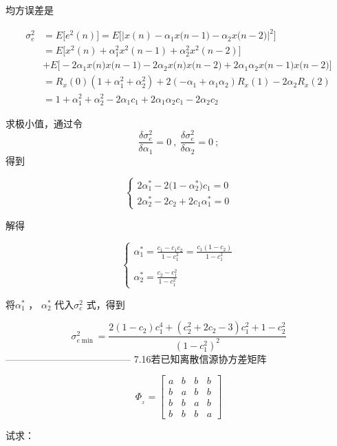 \documentclass[utf8]{article}
\begin{document}
均方误差是



$$\begin{aligned}
\sigma_{e}^{2}& =E\bigg[e^{2}\left(n\right)\bigg]=E\bigg[\bigg|x(n)-\alpha_{1}x\big(n-1\big)-\alpha_{2}x\big(n-2\big)\bigg|^{2}\bigg] \\
&=E\bigg[x^{2}\left(n\right)+\alpha_{1}^{2}x^{2}\left(n-1\right)+\alpha_{2}^{2}x^{2}\left(n-2\right)\bigg] \\
&+E\Big[-2\alpha_{1}x\big(n\big)x\big(n-1\big)-2\alpha_{2}x\big(n\big)x\big(n-2\big)+2\alpha_{1}\alpha_{2}x\big(n-1\big)x\big(n-2\big)\Big] \\
&=R_{x}\left(0\right)\left(1+\alpha_{1}^{2}+\alpha_{2}^{2}\right)+2\left(-\alpha_{1}+\alpha_{1}\alpha_{2}\right)R_{x}\left(1\right)-2\alpha_{2}R_{x}\left(2\right) \\
&=1+\alpha_{1}^{2}+\alpha_{2}^{2}-2\alpha_{1}c_{1}+2\alpha_{1}\alpha_{2}c_{1}-2\alpha_{2}c_{2}
\end{aligned}$$

求极小值，通过令$$\frac{\delta\sigma_{e}^{2}}{\delta\alpha_{1}}=0\:,\:\frac{\delta\sigma_{e}^{2}}{\delta\alpha_{2}}=0\:;$$
得到

$$\begin{cases}2\alpha_1^*-2\Big(1-\alpha_2^*\Big)c_1=0\\2\alpha_2^*-2c_2+2c_1\alpha_1^*=0\end{cases}$$

解得

$$\begin{cases}\alpha_1^*=\frac{c_1-c_1c_2}{1-c_1^2}=\frac{c_1\left(1-c_2\right)}{1-c_1^2}\\\\\alpha_2^*=\frac{c_2-c_1^2}{1-c_1^2}\end{cases}$$

将$\alpha_{1}^{*}$ ， $\alpha_{2}^*$ 代入$\sigma_{c}^{2}$ 式，得到

$$\sigma_{e\min}^{2}=\frac{2\left(1-c_{2}\right)c_{1}^{4}+\left(c_{2}^{2}+2c_{2}-3\right)c_{1}^{2}+1-c_{2}^{2}}{\left(1-c_{1}^{2}\right)^{2}}$$
---------------------------------------
7.16若已知离散信源协方差矩阵

$$\Phi_{_x}=\begin{bmatrix}a&b&b&b\\b&a&b&b\\b&b&a&b\\b&b&b&a\end{bmatrix}$$

试求：
\end{document}
